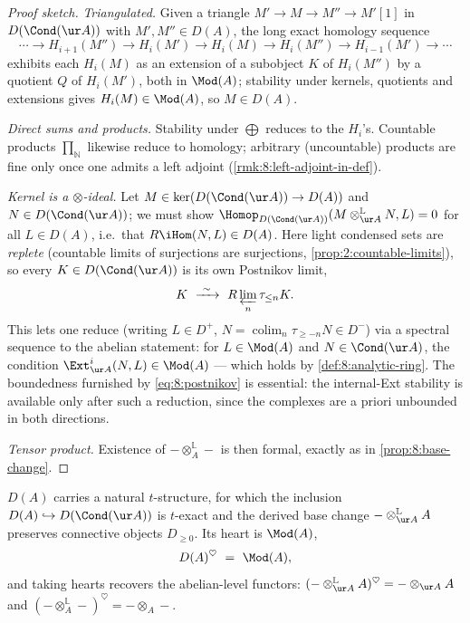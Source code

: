 \begin{proof}[Proof sketch]
\emph{Triangulated.} Given a triangle $M'\to M\to M''\to M'[1]$ in
$D(\Cond(\ur A))$ with $M',M''\in D(A)$, the long exact homology sequence
\begin{equation*}
\cdots\to H_{i+1}(M'')\to H_{i}(M')\to H_{i}(M)\to H_{i}(M'')\to H_{i-1}(M')\to\cdots
\end{equation*}
exhibits each $H_{i}(M)$ as an extension of a subobject $K$ of $H_i(M'')$ by a
quotient $Q$ of $H_i(M')$, both in $\Mod(A)$; stability under kernels, quotients
and extensions gives $H_{i}(M)\in\Mod(A)$, so $M\in D(A)$.

\emph{Direct sums and products.} Stability under $\bigoplus$ reduces to the
$H_{i}$'s. Countable products $\prod_{\mathbb{N}}$ likewise reduce to homology;
arbitrary (uncountable) products are fine only once one admits a left adjoint
(\cref{rmk:8:left-adjoint-in-def}).

\emph{Kernel is a $\otimes$-ideal.} Let $M\in\ker(D(\Cond(\ur A))\to D(A))$ and
$N\in D(\Cond(\ur A))$; we must show $\Homop_{D(\Cond(\ur A))}(M\otimes^{\mathbb{L}}
_{\ur A}N,L)=0$ for all $L\in D(A)$, i.e.\ that $R\iHom(N,L)\in D(A)$. Here light
condensed sets are \emph{replete} (countable limits of surjections are
surjections, \cref{prop:2:countable-limits}), so every $K\in D(\Cond(\ur A))$ is
its own Postnikov limit,
\begin{equation}
\label{eq:8:postnikov}
K\ \xrightarrow{\ \sim\ }\ R\varprojlim_{n}\tau_{\le n}K .
\end{equation}
This lets one reduce (writing $L\in D^{+}$, $N=\operatorname*{colim}_{n}\tau_{\ge-n}N
\in D^{-}$) via a spectral sequence to the abelian statement: for $L\in\Mod(A)$
and $N\in\Cond(\ur A)$, the condition $\Ext^{i}_{\ur A}(N,L)\in\Mod(A)$ --- which
holds by \cref{def:8:analytic-ring}. The boundedness furnished by
\eqref{eq:8:postnikov} is essential: the internal-Ext stability is available only
after such a reduction, since the complexes are a priori unbounded in both
directions.

\emph{Tensor product.} Existence of $-\otimes^{\mathbb{L}}_{A}-$ is then formal,
exactly as in \cref{prop:8:base-change}.
\end{proof}

\begin{proposition}
\label{prop:8:t-structure}
$D(A)$ carries a natural $t$-structure, for which the inclusion
$D(A)\hookrightarrow D(\Cond(\ur A))$ is $t$-exact and the derived base change
$-\otimes^{\mathbb{L}}_{\ur A}A$ preserves connective objects $D_{\ge0}$. Its
heart is $\Mod(A)$,
\begin{equation*}
D(A)^{\heartsuit}\ =\ \Mod(A),
\end{equation*}
and taking hearts recovers the abelian-level functors:
$(-\otimes^{\mathbb{L}}_{\ur A}A)^{\heartsuit}=-\otimes_{\ur A}A$ and
$(-\otimes^{\mathbb{L}}_{A}-)^{\heartsuit}=-\otimes_{A}-$.
\end{proposition}

